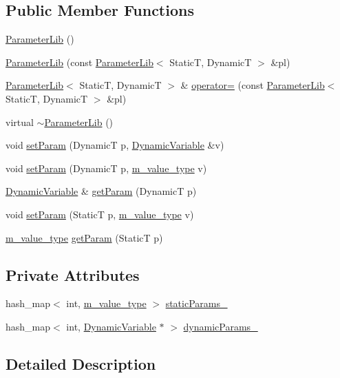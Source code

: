 \subsection*{Public Member Functions}
\begin{CompactItemize}
\item 
\hyperlink{classParameterLib_a0}{Parameter\-Lib} ()
\item 
\hyperlink{classParameterLib_a1}{Parameter\-Lib} (const  \hyperlink{classParameterLib}{Parameter\-Lib}$<$ Static\-T, Dynamic\-T $>$ \&pl)
\item 
\hyperlink{classParameterLib}{Parameter\-Lib}$<$ Static\-T, Dynamic\-T $>$ \& \hyperlink{classParameterLib_a2}{operator=} (const  \hyperlink{classParameterLib}{Parameter\-Lib}$<$ Static\-T, Dynamic\-T $>$ \&pl)
\item 
virtual \hyperlink{classParameterLib_a3}{$\sim$Parameter\-Lib} ()
\item 
void \hyperlink{classParameterLib_a4}{set\-Param} (Dynamic\-T p, \hyperlink{classDynamicVariable}{Dynamic\-Variable} \&v)
\item 
void \hyperlink{classParameterLib_a5}{set\-Param} (Dynamic\-T p, \hyperlink{Types_8h_a3}{m\_\-value\_\-type} v)
\item 
\hyperlink{classDynamicVariable}{Dynamic\-Variable} \& \hyperlink{classParameterLib_a6}{get\-Param} (Dynamic\-T p)
\item 
void \hyperlink{classParameterLib_a7}{set\-Param} (Static\-T p, \hyperlink{Types_8h_a3}{m\_\-value\_\-type} v)
\item 
\hyperlink{Types_8h_a3}{m\_\-value\_\-type} \hyperlink{classParameterLib_a8}{get\-Param} (Static\-T p)
\end{CompactItemize}
\subsection*{Private Attributes}
\begin{CompactItemize}
\item 
hash\_\-map$<$ int, \hyperlink{Types_8h_a3}{m\_\-value\_\-type} $>$ \hyperlink{classParameterLib_r0}{static\-Params\_\-}
\item 
hash\_\-map$<$ int, \hyperlink{classDynamicVariable}{Dynamic\-Variable} $\ast$ $>$ \hyperlink{classParameterLib_r1}{dynamic\-Params\_\-}
\end{CompactItemize}


\subsection{Detailed Description}
